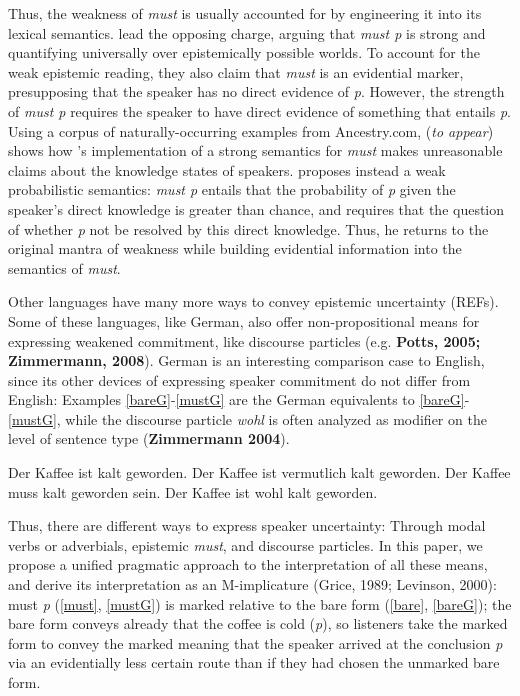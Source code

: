 \documentclass[11pt]{article}
\begin{document}
Thus, the weakness of \emph{must} is usually accounted for by engineering it into its lexical semantics.  lead the opposing charge, arguing that \emph{must p} is strong and quantifying universally over epistemically possible worlds. To account for the weak epistemic reading, they also claim that \emph{must} is an evidential marker, presupposing that the speaker has no direct evidence of \emph{p}. However, the strength of \emph{must p} requires the speaker to have direct evidence of something that entails \emph{p}. Using a corpus of naturally-occurring examples from Ancestry.com, \citeauthor{lassiter2014salt} (\emph{to appear}) shows how \citeauthor{vonfintelgillies2010}'s implementation of a strong semantics for \emph{must} makes unreasonable claims about the knowledge states of speakers. \citeauthor{lassiter2014salt} proposes instead a weak probabilistic semantics: \emph{must p} entails that the probability of \emph{p} given the speaker's direct knowledge is greater than chance, and requires that the question of whether \emph{p} not be resolved by this direct knowledge. Thus, he returns to the original mantra of weakness while building evidential information into the semantics of \emph{must}.

Other languages have many more ways to convey epistemic uncertainty (REFs). Some of these languages, like German, also offer non-propositional means for expressing weakened commitment, like discourse particles (e.g. \textbf{Potts, 2005; Zimmermann, 2008}). German is an interesting comparison case to English, since its other devices of expressing speaker commitment do not differ from English: Examples \ref{bareG}-\ref{mustG} are the German equivalents to \ref{bareG}-\ref{mustG}, while the discourse particle \emph{wohl} is often analyzed as modifier on the level of sentence type (\textbf{Zimmermann 2004}).

\begin{exe}
	\ex\label{german} \begin{xlist}
		\ex\label{bareG} Der Kaffee ist kalt geworden.
		\ex\label{probG} Der Kaffee ist vermutlich kalt geworden.
		\ex\label{mustG} Der Kaffee muss kalt geworden sein. 
		\ex\label{wohlG} Der Kaffee ist wohl kalt geworden.
	\end{xlist}
\end{exe}

Thus, there are different ways to express speaker uncertainty: Through modal verbs or adverbials, epistemic \emph{must}, and discourse particles. In this paper, we propose a unified pragmatic approach to the interpretation of all these means, and derive its interpretation as an M-implicature (Grice, 1989; Levinson, 2000): must \emph{p} (\ref{must}, \ref{mustG}) is marked relative to the bare form (\ref{bare}, \ref{bareG}); the bare form conveys already that the coffee is cold (\emph{p}), so listeners take the marked form to convey the marked meaning that the speaker arrived at the conclusion \emph{p} via an evidentially less certain route than if they had chosen the unmarked bare form. 
\end{document}

